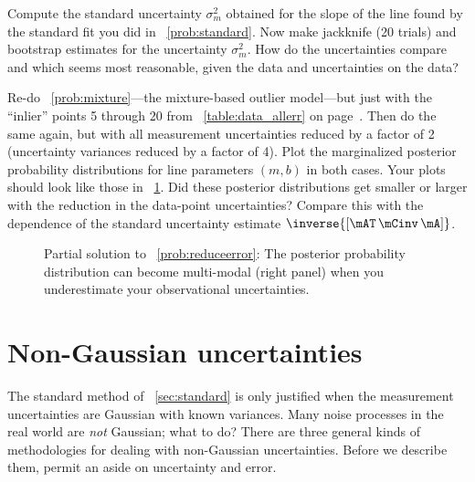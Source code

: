 \documentclass[12pt,twoside,pdftex]{article}
\begin{document}
\begin{problem}
Compute the standard uncertainty $\sigma_m^2$ obtained for the slope
of the line found by the standard fit you did in
\problemname~\ref{prob:standard}.  Now make jackknife (20 trials) and
bootstrap estimates for the uncertainty $\sigma_m^2$.  How do the
uncertainties compare and which seems most reasonable, given the data
and uncertainties on the data?
\end{problem}

\begin{problem}\label{prob:reduceerror}
Re-do \problemname~\ref{prob:mixture}---the mixture-based outlier
model---but just with the ``inlier'' points 5 through 20 from
\tablename~\ref{table:data_allerr} on
page~\pageref{table:data_allerr}.  Then do the same again, but with
all measurement uncertainties reduced by a factor of 2 (uncertainty
variances reduced by a factor of 4).  Plot the marginalized posterior
probability distributions for line parameters $(m,b)$ in both cases.
Your plots should look like those in
\figurename~\ref{fig:reduceerror}.  Did these posterior distributions
get smaller or larger with the reduction in the data-point
uncertainties?  Compare this with the dependence of the standard
uncertainty estimate $\inverse{\left[\mAT\,\mCinv\,\mA\right]}$.
\end{problem}

\begin{figure}[htbp]
\caption{Partial solution to \problemname~\ref{prob:reduceerror}: The
posterior probability distribution can become multi-modal (right
panel) when you underestimate your observational
uncertainties.}\label{fig:reduceerror}
\end{figure}

\section{Non-Gaussian uncertainties}\label{sec:non-Gaussian}

The standard method of \sectionname~\ref{sec:standard} is only
justified when the measurement uncertainties are Gaussian with known
variances.  Many noise processes in the real world are \emph{not}
Gaussian; what to do?  There are three general kinds of methodologies
for dealing with non-Gaussian uncertainties.  Before we describe them, permit
an aside on uncertainty and error.
\end{document}
